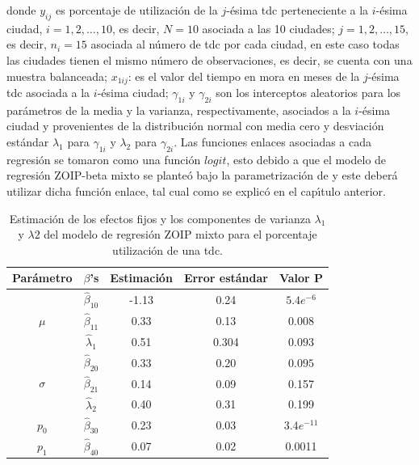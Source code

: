 donde $y_{ij}$ es porcentaje de utilizaci\'{o}n de la $j$-\'{e}sima tdc perteneciente a la $i$-\'{e}sima ciudad, $i=1,2,\ldots, 10$, es decir, $N=10$ asociada a las 10 ciudades; $j=1,2,\ldots, 15$, es decir, $n_i=15$ asociada al n\'{u}mero de tdc por cada ciudad, en este caso todas las ciudades tienen el mismo n\'{u}mero de observaciones, es decir, se cuenta con una muestra balanceada; $x_{1ij}$: es el valor del tiempo en mora en meses de la $j$-\'{e}sima tdc asociada a la $i$-\'{e}sima ciudad; $\gamma_{1i}$ y $\gamma_{2i}$ son los interceptos aleatorios para los par\'{a}metros de la media y la varianza, respectivamente, asociados a la $i$-\'{e}sima ciudad y provenientes de la distribuci\'{o}n normal con media cero y desviaci\'{o}n est\'{a}ndar $\lambda_1$ para $\gamma_{1i}$ y $\lambda_2$ para $\gamma_{2i}$. Las funciones enlaces asociadas a cada regresi\'{o}n se tomaron como una funci\'{o}n $logit$, esto debido a que el modelo de regresi\'{o}n ZOIP-beta mixto se plante\'{o} bajo la parametrizaci\'{o}n de \cite{Stasinopoulos2} y este deber\'{a} utilizar dicha funci\'{o}n enlace, tal cual como se explic\'{o} en el cap\'{\i}tulo anterior.\\

\begin{table}[!hbt]
{\scriptsize
\begin{center}
\begin{tabular}{|c|c|ccc|}\hline
Par\'{a}metro & $\beta$'s & Estimaci\'{o}n & Error est\'{a}ndar & Valor P \\ \hline \hline
\multirow{3}{*}{$\mu$} & $\hat{\beta}_{10}$ & -1.13	&0.24	&$5.4e^{-6}$\\
& $\hat{\beta}_{11}$ & 0.33	&0.13	&0.008\\
& $\hat{\lambda}_1$ & 0.51	&0.304	&$0.093$ \\ \hline
\multirow{3}{*}{$\sigma$} & $\hat{\beta}_{20}$ & 0.33	&0.20	&$0.095$\\
& $\hat{\beta}_{21}$ & 0.14	&0.09	&0.157\\
& $\hat{\lambda}_2$ & 0.40	&0.31	&0.199 \\ \hline
$p_0$ & $\hat{\beta}_{30}$ & 0.23	&0.03	&$3.4e^{-11}$ \\ \hline
$p_1$ & $\hat{\beta}_{40}$ &0.07	&0.02	&0.0011 \\ \hline
\end{tabular}
\caption{Estimaci\'{o}n de los efectos fijos y los componentes de varianza $\lambda_1$ y $\lambda2$ del modelo de regresi\'{o}n ZOIP mixto para el porcentaje utilizaci\'{o}n de una tdc.}
\label{T_Apli_mix}
\end{center}
}
\end{table}


